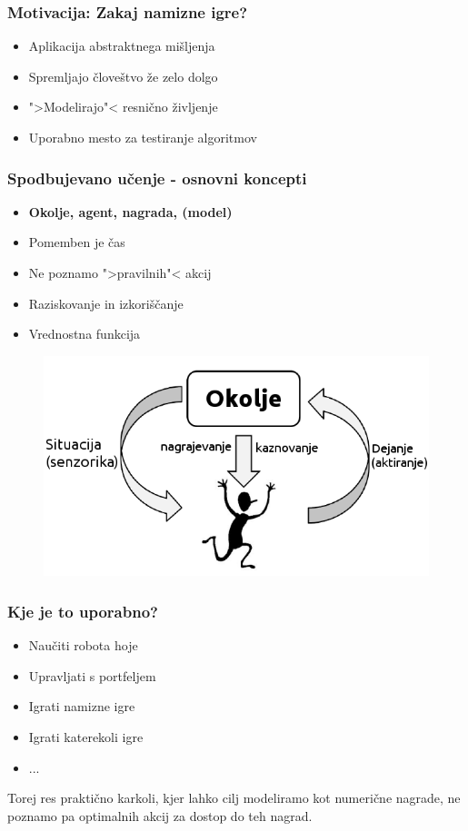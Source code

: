 \documentclass{beamer}    %
\begin{document}
\begin{frame}
    \frametitle{Motivacija: Zakaj namizne igre?}
    \begin{itemize}
        \item Aplikacija abstraktnega mišljenja
        \pause
        \item Spremljajo človeštvo že zelo dolgo
        \pause
        \item ">Modelirajo"< resnično življenje
        \pause
        \item Uporabno mesto za testiranje algoritmov
    \end{itemize}
\end{frame}


\begin{frame}
    \frametitle{Spodbujevano učenje - osnovni koncepti}
    \begin{itemize}
        \item \textbf{Okolje, agent, nagrada, (model)}
        \item Pomemben je čas
        \item Ne poznamo ">pravilnih"< akcij
        \item Raziskovanje in izkoriščanje
        \item Vrednostna funkcija
    \end{itemize}

    \begin{figure}
        \includegraphics[scale=0.5]{slike/RLloop.png}
    \end{figure}
\end{frame}


\begin{frame}
    \frametitle{Kje je to uporabno?}
    \begin{itemize}
        \item Naučiti robota hoje
        \item Upravljati s portfeljem
        \item Igrati namizne igre
        \item Igrati katerekoli igre
        \item ...
    \end{itemize}
    Torej res praktično karkoli, kjer lahko cilj modeliramo kot numerične
    nagrade, ne poznamo pa optimalnih akcij za dostop do teh nagrad.
\end{frame}
\end{document}

